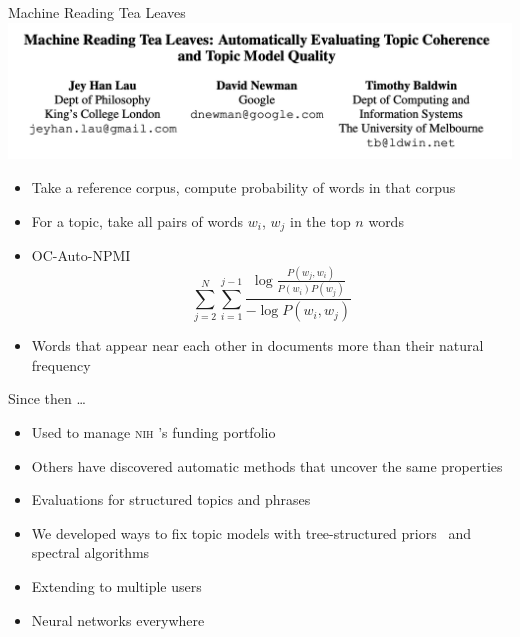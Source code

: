 \documentclass[compress]{beamer}
\newcommand{\abr}[1]{\textsc{#1} }
\begin{document}
\begin{frame}{Machine Reading Tea Leaves}
  \includegraphics[width=.8\paperwidth]{reading_tea_leaves/machine_reading_tea_leaves}

  \begin{itemize}
  \item Take a reference corpus, compute probability of words in that corpus
  \item For a topic, take all pairs of words $w_i$, $w_j$ in the top
    $n$ words
  \item OC-Auto-NPMI
    \begin{equation}
      \sum_{j=2}^{N}\sum_{i=1}^{j-1}{{ \frac{\log \frac{P(w_j,
          w_i)}{P(w_i)P(w_j)}}{-\log P(w_i, w_j)}}}
    \end{equation}
    \item Words that appear near each other in documents more than
      their natural frequency
  \end{itemize}
  
\end{frame}


\begin{frame}{Since then \dots}

  \begin{itemize}
    \item Used to manage \abr{nih}'s funding portfolio~\cite{talley-11}
    \item \alert<2>{Others have discovered automatic methods that uncover the same properties}~\cite{newman-10,mimno-11}
    \item Evaluations for structured topics and
      phrases~\cite{lindsey-12,weninger-12}
      \item We developed ways to fix topic models with tree-structured
        priors~\cite{hu-14} and spectral algorithms~\cite{Lund-17}
      \item Extending to multiple users~\cite{Felt-15}
        \pause
        \item Neural networks everywhere
  \end{itemize}

\end{frame}
\end{document}
